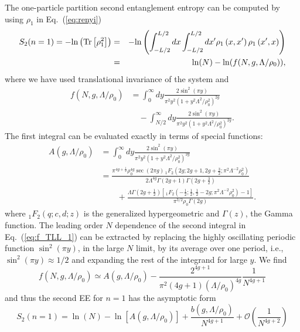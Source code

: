 The one-particle partition second \ren entanglement entropy can be computed by using
$\rho_1$ in Eq.~(\ref{eq:renyi}) 
%
\begin{eqnarray}
S_2(n = 1)=-{\rm{ln}}\left({\rm{Tr}}\left[{\rho}^2_1\right]\right)&=&
    -{\rm{ln}}\left(\int_{-L/2}^{L/2} dx \int_{-L/2}^{L/2}dx'
    \rho_1\left(x,x'\right)\rho_1\left(x',x\right)\right)\nonumber\\ &=&
    {\rm{ln}}(N)-{\rm{ln}}(f(N,g,\Lambda/\rho_0)),\label{eq:S2_TLL}
\end{eqnarray}
%
where we have used translational invariance of the system and 
%
\begin{align}
    f(N,g,\Lambda/\rho_0) & =\int_{0}^{\infty} dy\frac{2\sin^2(\pi
y)}{\pi^2y^2(1+y^2\Lambda^2/\rho_0^2)^{2g}} \nonumber \\
& \quad -\int_{N/2}^{\infty} dy\frac{2\sin^2(\pi y)}{\pi^2y^2(1+y^2\Lambda^2/\rho_0^2)^{2g}}. 
\label{eq:f_TLL_1}
\end{align}
% 
The first integral can be evaluated exactly in terms of special functions:
%
\begin{align}
A (g,\Lambda/\rho_0) &= \int_{0}^{\infty} dy\frac{2\sin^2(\pi
y)}{\pi^2y^2(1+y^2\Lambda^2/\rho_0^2)^{2g}} \nonumber \\
&= \frac{ \pi ^{4 g+\frac{1}{2}} \rho_0 ^{4g} \sec (2 \pi
g) \, _1F_2\left(2 g;2 g+1,2 g+\frac{3}{2};\pi ^2 \Lambda ^{-2}\rho_0
^2\right)}{2 \Lambda ^{4 g} \Gamma (2 g+1) \Gamma (2 g+\frac{3}{2})}\nonumber\\
&\quad\quad + \frac{ \Lambda\Gamma \left(2 g+\frac{1}{2}\right) \left[\,
_1F_2\left(-\frac{1}{2};\frac{1}{2},\frac{1}{2}-2 g;\pi ^2 \Lambda ^{-2} \rho_0
^2\right)-1\right]}{\pi ^{3/2} \rho_0 \Gamma (2 g)}.
\label{eq:A_TLL}
\end{align}
% 
where $_1F_2(q;c,d;z)$ is the generalized hypergeometric and $\Gamma(z)$, the
Gamma function.  The leading order $N$ dependence of the
second integral in Eq.~(\ref{eq:f_TLL_1}) can be extracted by replacing the
highly oscillating periodic function $\sin^2(\pi y)$, in the large $N$ limit,
by its average over one period, i.e., $\sin^2(\pi y) \approx 1/2$ and
expanding the rest of the integrand for large $y$. We find
%
\begin{equation}
f(N,g,\Lambda/\rho_0) \simeq  A(g,\Lambda/\rho_0)-\frac{2^{4 g+1}}{\pi ^2 (4
g+1)(\Lambda/\rho_0)^{4g}} \frac{1}{N^{4g+1}} 
\label{eq:f_infty}
\end{equation}
%
and thus the second \ren EE for $n=1$ has the asymptotic form
%
\begin{equation}
S_2(n=1) =  \ln(N)-\ln\left[A(g,\Lambda/\rho_0)\right] +
\frac{b(g,\Lambda/\rho_0)}{N^{4g+1}}
+\mathcal{O}\left(\frac{1}{N^{4g+2}}\right)
\label{eq:s2n1_asymptotic}
\end{equation}
